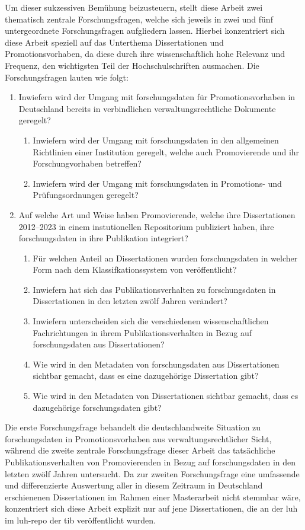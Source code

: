 Um dieser sukzessiven Bemühung beizusteuern, stellt diese Arbeit zwei thematisch zentrale Forschungsfragen, welche sich jeweils in zwei und fünf untergeordnete Forschungsfragen aufgliedern lassen.
Hierbei konzentriert sich diese Arbeit speziell auf das Unterthema Dissertationen und Promotionsvorhaben, da diese durch ihre wissenschaftlich hohe Relevanz und Frequenz, den wichtigsten Teil der Hochschulschriften ausmachen.
Die Forschungsfragen lauten wie folgt:
\begin{enumerate}
    \item Inwiefern wird der Umgang mit \gls{forschungsdaten} für Promotionsvorhaben in Deutschland bereits in verbindlichen verwaltungsrechtliche Dokumente geregelt?
    \begin{enumerate}
        \item Inwiefern wird der Umgang mit \gls{forschungsdaten} in den allgemeinen Richtlinien einer Institution geregelt, welche auch Promovierende und ihr Forschungvorhaben betreffen?
        \item Inwiefern wird der Umgang mit \gls{forschungsdaten} in Promotions- und Prüfungsordnungen geregelt?
    \end{enumerate}
    \item Auf welche Art und Weise haben Promovierende, welche ihre Dissertationen 2012--2023 in einem instutionellen Repositorium publiziert haben, ihre \gls{forschungsdaten} in ihre Publikation integriert?
    \begin{enumerate}
        \item Für welchen Anteil an Dissertationen wurden \gls{forschungsdaten} in welcher Form nach dem Klassifkationssystem von \citeauthor{ReillyEtAl2011} \autocite{ReillyEtAl2011} veröffentlicht?
        \item Inwiefern hat sich das Publikationsverhalten zu \gls{forschungsdaten} in Dissertationen in den letzten zwölf Jahren verändert?
        \item Inwiefern unterscheiden sich die verschiedenen wissenschaftlichen Fachrichtungen in ihrem Publikationsverhalten in Bezug auf \gls{forschungsdaten} aus Dissertationen?
        \item Wie wird in den Metadaten von \gls{forschungsdaten} aus Dissertationen sichtbar gemacht, dass es eine dazugehörige Dissertation gibt?
        \item Wie wird in den Metadaten von Dissertationen sichtbar gemacht, dass es dazugehörige \gls{forschungsdaten} gibt?
    \end{enumerate}
\end{enumerate}
Die erste Forschungsfrage behandelt die deutschlandweite Situation zu \gls{forschungsdaten} in Promotionsvorhaben aus verwaltungsrechtlicher Sicht, während die zweite zentrale Forschungsfrage dieser Arbeit das tatsächliche Publikationsverhalten von Promovierenden in Bezug auf \gls{forschungsdaten} in den letzten zwölf Jahren untersucht.
Da zur zweiten Forschungsfrage eine umfassende und differenzierte Auswertung aller in diesem Zeitraum in Deutschland erschienenen Dissertationen im Rahmen einer Masterarbeit nicht stemmbar wäre, konzentriert sich diese Arbeit explizit nur auf jene Dissertationen, die an der \gls{luh} im \gls{luh-repo} der \gls{tib} veröffentlicht wurden.


